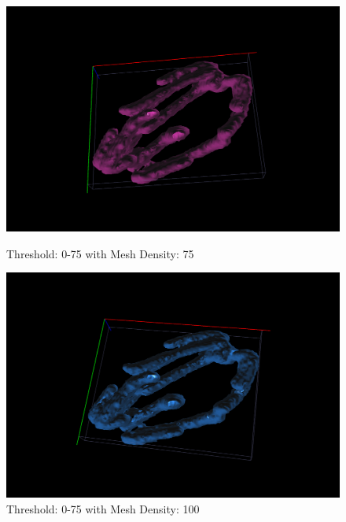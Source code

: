 \documentclass{article}
\begin{document}
\begin{figure}[h!]
\begin{minipage}[b]{0.5\linewidth}
    \vspace{4ex}
  \end{minipage} 
  \begin{minipage}[b]{0.5\linewidth}
    \centering
    \includegraphics[width=.8\linewidth]{Report/Images/6.3.2/0-75,75.png}
    \captionsetup{width=.8\linewidth}
    \caption{Threshold: 0-75 with Mesh Density: 75}
    \label{fig:075_75}
    \vspace{4ex}
  \end{minipage}%
  \begin{minipage}[b]{0.5\linewidth}
    \centering
    \includegraphics[width=.8\linewidth]{Report/Images/6.3.2/0-75,100.png}
    \captionsetup{width=.8\linewidth}
    \caption{Threshold: 0-75 with Mesh Density: 100}
    \label{fig:075_100}
    \vspace{4ex}
  \end{minipage} 
\end{figure}
\end{document}
